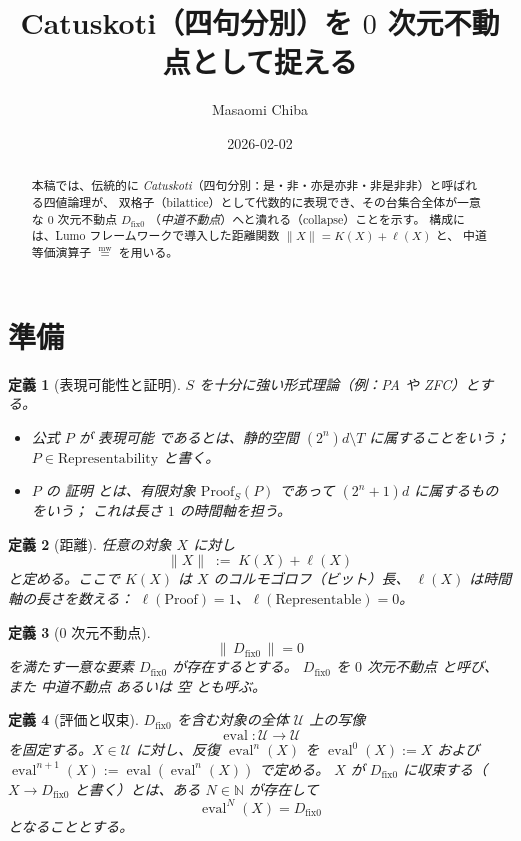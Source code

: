 \documentclass[12pt,a4paper]{article}
\newcommand{\dfix}{D_{\mathrm{fix}0}} %
\newcommand{\mw}{\mathrel{\overset{\mathrm{mw}}{=}}} %
\newtheorem{definition}{定義}[section]
\begin{document}
\title{Catuskoti（四句分別）を $0$ 次元不動点として捉える}
\author{Masaomi Chiba}
\date{2026-02-02}
\maketitle

\begin{abstract}
本稿では、伝統的に \emph{Catuskoti}（四句分別：是・非・亦是亦非・非是非非）と呼ばれる四値論理が、
双格子（bilattice）として代数的に表現でき、その台集合全体が一意な $0$ 次元不動点 $\dfix$
（\emph{中道不動点}）へと潰れる（collapse）ことを示す。
構成には、Lumo フレームワークで導入した距離関数 $\|X\|=K(X)+\ell(X)$ と、
中道等価演算子 $\mw$ を用いる。
\end{abstract}

\section{準備}

\begin{definition}[表現可能性と証明]
$S$ を十分に強い形式理論（例：PA や ZFC）とする。
\begin{itemize}
  \item 公式 $P$ が \emph{表現可能} であるとは、静的空間 $(2^{n})d\!\setminus\!T$ に属することをいう；
        $P\in\text{Representability}$ と書く。
  \item $P$ の \emph{証明} とは、有限対象 $\text{Proof}_{S}(P)$ であって $(2^{n}+1)d$ に属するものをいう；
        これは長さ $1$ の時間軸を担う。
\end{itemize}
\end{definition}

\begin{definition}[距離]
任意の対象 $X$ に対し
$$
\|X\|\;:=\;K(X)+\ell(X)
$$
と定める。ここで $K(X)$ は $X$ のコルモゴロフ（ビット）長、
$\ell(X)$ は時間軸の長さを数える：
$\ell(\text{Proof})=1$、$\ell(\text{Representable})=0$。
\end{definition}

\begin{definition}[$0$ 次元不動点]
$$
\|\,\dfix\,\|=0
$$
を満たす一意な要素 $\dfix$ が存在するとする。
$\dfix$ を \emph{$0$ 次元不動点} と呼び、また \emph{中道不動点} あるいは \emph{空} とも呼ぶ。
\end{definition}

\begin{definition}[評価と収束]
$\dfix$ を含む対象の全体 $\mathcal{U}$ 上の写像
\[
  \operatorname{eval}:\mathcal{U}\to\mathcal{U}
\]
を固定する。$X\in\mathcal{U}$ に対し、反復 $\operatorname{eval}^n(X)$ を
$\operatorname{eval}^0(X):=X$ および $\operatorname{eval}^{n+1}(X):=\operatorname{eval}(\operatorname{eval}^n(X))$ で定める。
$X$ が $\dfix$ に\emph{収束する}（$X\to\dfix$ と書く）とは、ある $N\in\mathbb{N}$ が存在して
\[
  \operatorname{eval}^N(X)=\dfix
\]
となることとする。
\end{definition}
\end{document}
